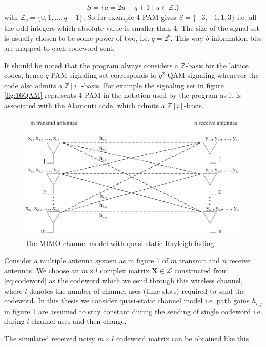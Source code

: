 \documentclass[english,12pt,a4paper,pdftex,sci,utf8]{aaltothesis}
\begin{document}
\begin{equation}
S = \{a = 2u-q+1\mid u \in \mathbb{Z}_q\}
\label{eq:pam}
\end{equation}
with $\mathbb{Z}_q = \{0,1,...,q-1\}$. So for example 4-PAM gives $S = \{-3, -1,1,3\}$ i.e. all the odd integers which absolute value is smaller than 4. The size of the signal set is usually chosen to be some power of two, i.e. $q = 2^b$. This way $b$ information bits are mapped to each codeword sent. \cite{mia} 
\par It should be noted that the program always considers a $\mathbb{Z}$-basis for the lattice codes, hence $q$-PAM signaling set corresponds to $q^2$-QAM signaling whenever the code also admits a $\mathbb{Z}[i]$-basis.
For example the signaling set in figure \ref{fig:16QAM} represents 4-PAM in the notation used by the program as it is associated with the Alamouti code, which admits a $\mathbb{Z}[i]$-basis.

\begin{figure}[ht]
  \centering
  \includegraphics[width=\linewidth]{mimo}
  \caption{The MIMO-channel model with quasi-static Rayleigh fading \cite{mia}.}
  \label{fig:mimo}
\end{figure}

\par Consider a multiple antenna system as in figure \ref{fig:mimo} of $m$ transmit and $n$ receive antennas. We choose an $m\times l$ complex matrix $\mathbf{X} \in \mathcal{L}$ constructed from \eqref{eq:codeword} as the codeword which we send through this wireless channel, where $l$ denotes the number of channel uses (time slots) required to send the codeword. In this thesis we consider quasi-static channel model i.e. path gains $h_{i,j}$ in figure \ref{fig:mimo} are assumed to stay constant during the sending of single codeword i.e. during $l$ channel uses and then change. 
\par The simulated received noisy $m\times l$ codeword matrix can be obtained like this
\end{document}
